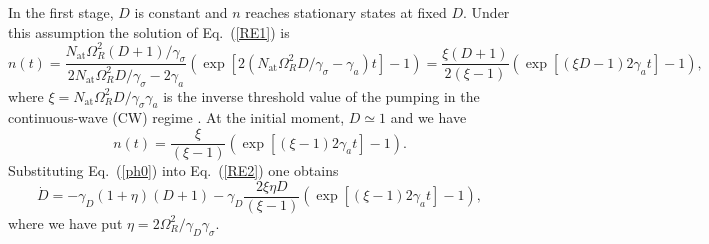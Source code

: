\documentclass[aps,prapplied,amsmath,amssymb,onecolumn,superscriptaddress,showpacs,floatfix,longbibliography]{revtex4-1}
\begin{document}
In the first stage, $D$ is constant and $n$ reaches stationary states at fixed $D$.
Under this assumption the solution of Eq.~(\ref{RE1}) is
\begin{equation} 
n\left( t \right) = \frac{{{N_{\text{at}}}\Omega _R^2\left( {D + 1} \right)/{\gamma _\sigma }}}{{2{N_{\text{at}}}\Omega _R^2D/{\gamma _\sigma } - 2 {\gamma _a}}}\left( {\exp \left[ 2\left( {{N_{\text{at}}}\Omega _R^2D/{\gamma _\sigma } - {\gamma _a}} \right)t \right] - 1} \right) = \frac{{\xi \left( {D + 1} \right)}}{{2\left( {\xi-1} \right)}}\left( {\exp \left[\left( {\xi D - 1} \right) 2 {\gamma _a}t \right] - 1} \right), \label{ph}
\end{equation}
where $\xi={{N_{\text{at}}}\Omega _R^2D/{\gamma _\sigma \gamma_a }}$ is the inverse threshold value of the pumping in the continuous-wave (CW) regime \cite{ScullyQO}.
At the initial moment, $D \simeq 1$ and we have  
\begin{equation} 
n\left( t \right) = \frac{\xi }{{\left( {\xi - 1} \right)}}\left( {\exp \left[ \left( {\xi  - 1} \right) 2 {\gamma _a}t \right] - 1} \right). \label{ph0}
\end{equation}
Substituting Eq.~(\ref{ph0}) into Eq.~(\ref{RE2}) one obtains
\begin{equation} 
\dot D =  - {\gamma _D}\left( {1 + \eta } \right)\left( {D + 1} \right) - {\gamma _D}\frac{{2\xi \eta D}}{{\left( {\xi  - 1} \right)}}\left( {\exp \left[\left( {\xi  - 1} \right) 2 {\gamma _a}t \right] - 1} \right), \label{inv0}
\end{equation}
where we have put $\eta = 2 \Omega_R^2 /\gamma_D \gamma_\sigma$. 
\end{document}
